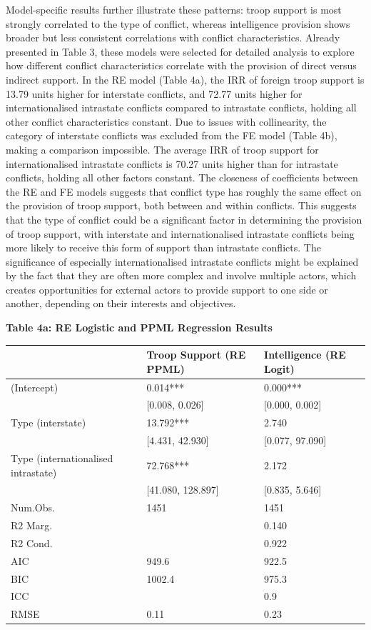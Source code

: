\documentclass[
]{article}
\begin{document}
Model-specific results further illustrate these patterns: troop support
is most strongly correlated to the type of conflict, whereas
intelligence provision shows broader but less consistent correlations
with conflict characteristics. Already presented in Table 3, these
models were selected for detailed analysis to explore how different
conflict characteristics correlate with the provision of direct versus
indirect support. In the RE model (Table 4a), the IRR of foreign troop
support is 13.79 units higher for interstate conflicts, and 72.77 units
higher for internationalised intrastate conflicts compared to intrastate
conflicts, holding all other conflict characteristics constant. Due to
issues with collinearity, the category of interstate conflicts was
excluded from the FE model (Table 4b), making a comparison impossible.
The average IRR of troop support for internationalised intrastate
conflicts is 70.27 units higher than for intrastate conflicts, holding
all other factors constant. The closeness of coefficients between the RE
and FE models suggests that conflict type has roughly the same effect on
the provision of troop support, both between and within conflicts. This
suggests that the type of conflict could be a significant factor in
determining the provision of troop support, with interstate and
internationalised intrastate conflicts being more likely to receive this
form of support than intrastate conflicts. The significance of
especially internationalised intrastate conflicts might be explained by
the fact that they are often more complex and involve multiple actors,
which creates opportunities for external actors to provide support to
one side or another, depending on their interests and objectives.

\newpage

\noindent\textbf{Table 4a: RE Logistic and PPML Regression Results}

\begin{tabular}{lll}
\hline
& Troop Support (RE PPML) & Intelligence (RE Logit) \\ \hline
(Intercept) & \num{0.014}*** & \num{0.000}*** \\
& [\num{0.008}, \num{0.026}] & [\num{0.000}, \num{0.002}] \\
Type (interstate) & \num{13.792}*** & \num{2.740} \\
& [\num{4.431}, \num{42.930}] & [\num{0.077}, \num{97.090}] \\
Type (internationalised intrastate) & \num{72.768}*** & \num{2.172} \\
& [\num{41.080}, \num{128.897}] & [\num{0.835}, \num{5.646}] \\
Num.Obs. & \num{1451} & \num{1451} \\
R2 Marg. &  & \num{0.140} \\
R2 Cond. &  & \num{0.922} \\
AIC & \num{949.6} & \num{922.5} \\
BIC & \num{1002.4} & \num{975.3} \\
ICC &  & \num{0.9} \\
RMSE & \num{0.11} & \num{0.23} \\
\hline
\end{tabular}
\end{document}
